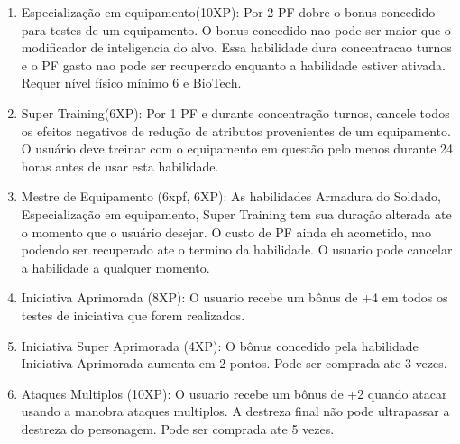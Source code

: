 \begin{enumerate}
	\item Especialização em equipamento(10XP): Por 2 PF dobre o bonus concedido para testes de um equipamento. O bonus concedido nao pode ser maior que o modificador de inteligencia do alvo. Essa habilidade dura concentracao turnos e o PF gasto nao pode ser recuperado enquanto a habilidade estiver ativada. Requer nível físico mínimo 6 e BioTech. 

	\item Super Training(6XP): Por 1 PF e durante concentração turnos, cancele todos os efeitos negativos de redução de atributos provenientes de um equipamento. O usuário deve treinar com o equipamento em questão pelo menos durante 24 horas antes de usar esta habilidade. 

    \item Mestre de Equipamento (6xpf, 6XP): As habilidades Armadura do Soldado, Especialização em equipamento, Super Training tem sua duração alterada ate o momento que o usuário desejar. O custo de PF ainda eh acometido, nao podendo ser recuperado ate o termino da habilidade. O usuario pode cancelar a habilidade a qualquer momento.




	\item Iniciativa Aprimorada (8XP): O usuario recebe um bônus de +4 em todos os testes de iniciativa que forem realizados.

	\item Iniciativa Super Aprimorada (4XP): O bônus concedido pela habilidade Iniciativa Aprimorada aumenta em 2 pontos. Pode ser comprada ate 3 vezes.

	\item Ataques Multiplos (10XP): O usuario recebe um bônus de +2 quando atacar usando a manobra ataques multiplos. A destreza final não pode ultrapassar a destreza do personagem. Pode ser comprada ate 5 vezes. 
	

\end{enumerate}
